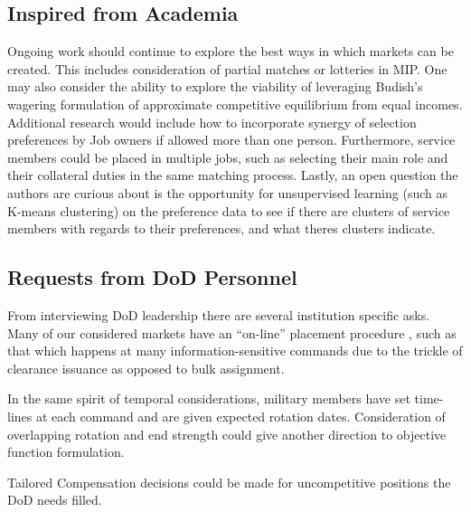 \subsection{Inspired from Academia}

Ongoing work should continue to explore the best ways in which markets can be created. This includes consideration of partial matches or lotteries in MIP.\citep{1993_Roth} One may also consider the ability to explore the viability of leveraging Budish's wagering formulation of approximate competitive equilibrium from equal incomes.  \citep{2011_Budish} Additional research would include how to incorporate synergy of selection preferences by Job owners if allowed more than one person. \citep{1985_Roth_b}  Furthermore, service members could be placed in multiple jobs, such as selecting their main role and their collateral duties in the same matching process. \citep{1982_Roth} Lastly, an open question the authors are curious about is the opportunity for unsupervised learning (such as K-means clustering) on the preference data to see if there are clusters of service members with regards to their preferences, and what theres clusters indicate.

\subsection{Requests from DoD Personnel}

From interviewing DoD leadership there are several institution specific asks. Many of our considered markets have an “on-line” placement procedure \citep{1994_Khuller}, such as that which happens at many information-sensitive commands due to the trickle of clearance issuance as opposed to bulk assignment. 

In the same spirit of temporal considerations, military members have set time-lines at each command and are given expected rotation dates. Consideration of overlapping rotation and end strength could give another direction to objective function formulation.

Tailored Compensation decisions could be made for uncompetitive positions the DoD needs filled.

